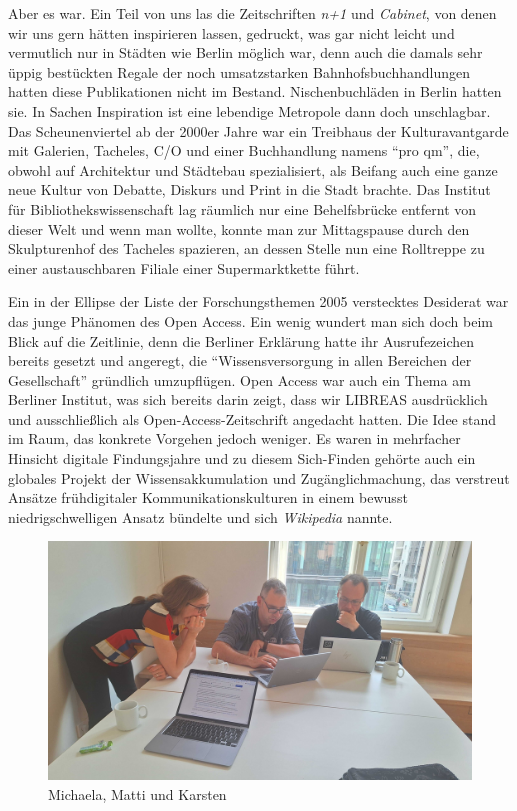 \documentclass[a4paper,
fontsize=11pt,
oneside,
numbers=noperiodatend,
parskip=half-,
bibliography=totoc,
final
]{scrartcl}
\begin{document}
Aber es war. Ein Teil von uns las die Zeitschriften \emph{n+1} und
\emph{Cabinet}, von denen wir uns gern hätten inspirieren lassen,
gedruckt, was gar nicht leicht und vermutlich nur in Städten wie Berlin
möglich war, denn auch die damals sehr üppig bestückten Regale der noch
umsatzstarken Bahnhofsbuchhandlungen hatten diese Publikationen nicht im
Bestand. Nischenbuchläden in Berlin hatten sie. In Sachen Inspiration
ist eine lebendige Metropole dann doch unschlagbar. Das Scheunenviertel
ab der 2000er Jahre war ein Treibhaus der Kulturavantgarde mit Galerien,
Tacheles, C/O und einer Buchhandlung namens \enquote{pro qm}, die,
obwohl auf Architektur und Städtebau spezialisiert, als Beifang auch
eine ganze neue Kultur von Debatte, Diskurs und Print in die Stadt
brachte. Das Institut für Bibliothekswissenschaft lag räumlich nur eine
Behelfsbrücke entfernt von dieser Welt und wenn man wollte, konnte man
zur Mittagspause durch den Skulpturenhof des Tacheles spazieren, an
dessen Stelle nun eine Rolltreppe zu einer austauschbaren Filiale einer
Supermarktkette führt.

Ein in der Ellipse der Liste der Forschungsthemen 2005 verstecktes
Desiderat war das junge Phänomen des Open Access. Ein wenig wundert man
sich doch beim Blick auf die Zeitlinie, denn die Berliner Erklärung
hatte ihr Ausrufezeichen bereits gesetzt und angeregt, die
\enquote{Wissensversorgung in allen Bereichen der Gesellschaft}
gründlich umzupflügen. Open Access war auch ein Thema am Berliner
Institut, was sich bereits darin zeigt, dass wir LIBREAS ausdrücklich
und ausschließlich als Open-Access-Zeitschrift angedacht hatten. Die
Idee stand im Raum, das konkrete Vorgehen jedoch weniger. Es waren in
mehrfacher Hinsicht digitale Findungsjahre und zu diesem Sich-Finden
gehörte auch ein globales Projekt der Wissensakkumulation und
Zugänglichmachung, das verstreut Ansätze frühdigitaler
Kommunikationskulturen in einem bewusst niedrigschwelligen Ansatz
bündelte und sich \emph{Wikipedia} nannte.

\begin{figure}[H]
\centering
\includegraphics[width=.7\textwidth]{img/Abb2.jpg}
\caption{Michaela, Matti und Karsten}
\end{figure}
\end{document}
